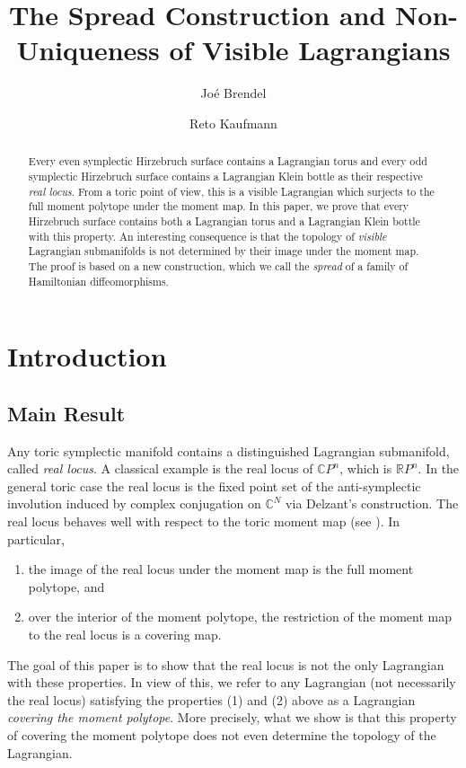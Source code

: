 \documentclass[10pt,oneside,reqno]{amsart}
\title{The Spread Construction and Non-Uniqueness of Visible Lagrangians}
\author{Jo\'e Brendel}
\author{Reto Kaufmann}
\theoremstyle{definition}
\newcommand{\R}{\mathbb{R}}
\newcommand{\C}{\mathbb{C}}
\begin{document}
\maketitle

\begin{abstract}
    Every even symplectic Hirzebruch surface contains a Lagrangian torus and every odd symplectic Hirzebruch surface contains a Lagrangian Klein bottle as their respective \emph{real locus}. From a toric point of view, this is a visible Lagrangian which surjects to the full moment polytope under the moment map. In this paper, we prove that every Hirzebruch surface contains both a Lagrangian torus and a Lagrangian Klein bottle with this property. An interesting consequence is that the topology of \emph{visible} Lagrangian submanifolds is not determined by their image under the moment map. The proof is based on a new construction, which we call the \emph{spread} of a family of Hamiltonian diffeomorphisms.
\end{abstract}

\tableofcontents
\section{Introduction}
\subsection{Main Result}
Any toric symplectic manifold contains a distinguished Lagrangian submanifold, called \emph{real locus}. A classical example is the real locus of $\C P^n$, which is $\R P^n$. In the general toric case the real locus is the fixed point set of the anti-symplectic involution induced by complex conjugation on $\C^N$ via Delzant's construction. The real locus behaves well with respect to the toric moment map (see \cite{duistermaat1983convexity}). In particular, 
\begin{enumerate}
    \item the image of the real locus under the moment map is the full moment polytope, and
    \item over the interior of the moment polytope, the restriction of the moment map to the real locus is a covering map. 
\end{enumerate} 

The goal of this paper is to show that the real locus is not the only Lagrangian with these properties. In view of this, we refer to any Lagrangian (not necessarily the real locus) satisfying the properties (1) and (2) above as a Lagrangian \emph{covering the moment polytope}. More precisely, what we show is that this property of covering the moment polytope does not even determine the topology of the Lagrangian.
\end{document}
